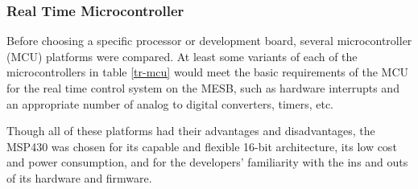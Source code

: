 \documentclass[letterpaper,12pt]{article}
\begin{document}
\subsubsection{Real Time Microcontroller}
Before choosing a specific processor or development board, several microcontroller (MCU) platforms were compared. At least some variants of each of the microcontrollers in table \ref{tr-mcu} would meet the basic requirements of the MCU for the real time control system on the MESB, such as hardware interrupts and an appropriate number of analog to digital converters, timers, etc.
\begin{table}[!htbp]
\caption{Real Time Microcontroller Trade Study}
\label{tr-mcu}
\end{table}
Though all of these platforms had their advantages and disadvantages, the MSP430 was chosen for its capable and flexible 16-bit architecture, its low cost and power consumption, and for the developers' familiarity with the ins and outs of its hardware and firmware.
\end{document}
